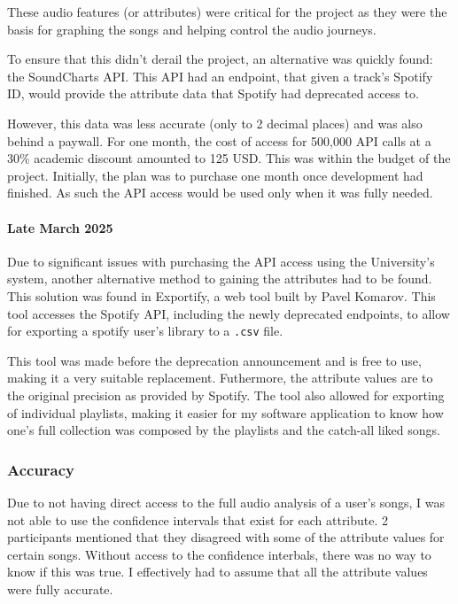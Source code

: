 These audio features (or attributes) were critical for the project as they were the basis for graphing the songs and helping control the audio journeys.

To ensure that this didn't derail the project, an alternative was quickly found: the SoundCharts API. This API had an endpoint, that given a track's Spotify ID, would provide the attribute data that Spotify had deprecated access to.

However, this data was less accurate (only to 2 decimal places) and was also behind a paywall. For one month, the cost of access for 500,000 API calls at a 30\% academic discount amounted to 125 USD. This was within the budget of the project. Initially, the plan was to purchase one month once development had finished. As such the API access would be used only when it was fully needed.

\paragraph{Late March 2025} Due to significant issues with purchasing the API access using the University's system, another alternative method to gaining the attributes had to be found. This solution was found in Exportify, a web tool built by Pavel Komarov. This tool accesses the Spotify API, including the newly deprecated endpoints, to allow for exporting a spotify user's library to a \lstinline|.csv| file.

This tool was made before the deprecation announcement and is free to use, making it a very suitable replacement. Futhermore, the attribute values are to the original precision as provided by Spotify. The tool also allowed for exporting of individual playlists, making it easier for my software application to know how one's full collection was composed by the playlists and the catch-all liked songs.

\subsubsection{Accuracy}%
Due to not having direct access to the full audio analysis of a user's songs, I was not able to use the confidence intervals that exist for each attribute. 2 participants mentioned that they disagreed with some of the attribute values for certain songs. Without access to the confidence interbals, there was no way to know if this was true. I effectively had to assume that all the attribute values were fully accurate.

